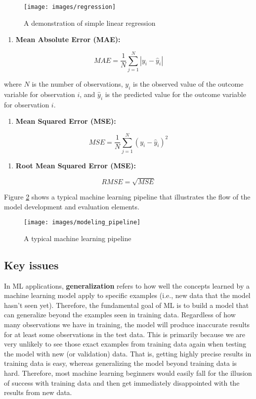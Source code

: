 \documentclass[
]{book}
\providecommand{\tightlist}{%
  \setlength{\itemsep}{0pt}\setlength{\parskip}{0pt}}
\begin{document}
\begin{figure}
\texttt{[image: images/regression]} \caption{A demonstration of simple linear regression}\label{fig:fig5-3b}
\end{figure}

\begin{enumerate}
\def\labelenumi{\arabic{enumi}.}
\tightlist
\item
  \textbf{Mean Absolute Error (MAE):}
\end{enumerate}

\[
MAE = \frac{1}{N} \sum_{j=1}^N |y_i-\hat{y}_i|
\]

where \(N\) is the number of observations, \(y_i\) is the observed value of the outcome variable for observation \(i\), and \(\hat{y}_i\) is the predicted value for the outcome variable for observation \(i\).

\begin{enumerate}
\def\labelenumi{\arabic{enumi}.}
\setcounter{enumi}{1}
\tightlist
\item
  \textbf{Mean Squared Error (MSE):}
\end{enumerate}

\[
MSE = \frac{1}{N} \sum_{j=1}^N (y_i-\hat{y}_i)^2
\]

\begin{enumerate}
\def\labelenumi{\arabic{enumi}.}
\setcounter{enumi}{2}
\tightlist
\item
  \textbf{Root Mean Squared Error (MSE):}
\end{enumerate}

\[
RMSE = \sqrt{MSE}
\]

Figure \ref{fig:fig5-3c} shows a typical machine learning pipeline that illustrates the flow of the model development and evaluation elements.

\begin{figure}
\texttt{[image: images/modeling\_pipeline]} \caption{A typical machine learning pipeline}\label{fig:fig5-3c}
\end{figure}

\hypertarget{key-issues}{%
\subsection{Key issues}\label{key-issues}}

In ML applications, \textbf{generalization} refers to how well the concepts learned by a machine learning model apply to specific examples (i.e., new data that the model hasn't seen yet). Therefore, the fundamental goal of ML is to build a model that can generalize beyond the examples seen in training data. Regardless of how many observations we have in training, the model will produce inaccurate results for at least some observations in the test data. This is primarily because we are very unlikely to see those exact examples from training data again when testing the model with new (or validation) data. That is, getting highly precise results in training data is easy, whereas generalizing the model beyond training data is hard. Therefore, most machine learning beginners would easily fall for the illusion of success with training data and then get immediately disappointed with the results from new data.
\end{document}
